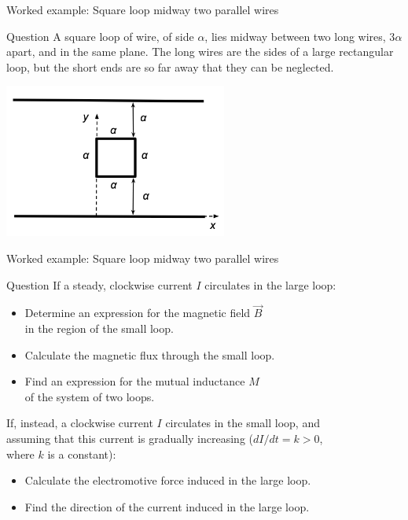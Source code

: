 {
\problemslide

%
%
%

\begin{frame}{Worked example: Square loop midway two parallel wires}

  \begin{blockexmplque}{Question}
    A square loop of wire, of side $\alpha$, lies midway between
    two long wires, 3$\alpha$ apart, and in the same plane.
    The long wires are the sides of a large rectangular loop, but the short
    ends are so far away that they can be neglected.
    \begin{center}
     \includegraphics[width=0.55\textwidth]{./images/problems/lect11_square_loop_between_wires_2}\\
    \end{center}
 \end{blockexmplque}

\end{frame}

%
%
%

\begin{frame}{Worked example: Square loop midway two parallel wires}

  \begin{blockexmplque}{Question}
    If a steady, clockwise current $I$ circulates in the large loop:
    \begin{itemize}
    \item
    Determine an expression for the magnetic field $\vec{B}$\\
    in the region of the small loop.
    \item
    Calculate the magnetic flux through the small loop.
    \item
    Find an expression for the mutual inductance $M$\\
    of the system of two loops.
    \end{itemize}
   If, instead, a clockwise current $I$ circulates in the small loop, and\\
   assuming that this current is gradually increasing
   ($dI/dt = k > 0$,\\ where $k$ is a constant):
    \begin{itemize}
    \item
    Calculate the electromotive force induced in the large loop.
    \item
    Find the direction of the current induced in the large loop.
    \end{itemize}
  \end{blockexmplque}


\end{frame}}
